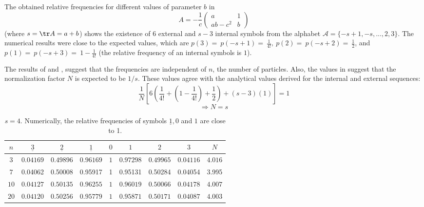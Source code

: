 The obtained relative frequencies for different values of parameter $b$ in
\[
A
= - \frac{1}{c}\left( \begin{array}{ll}
       a &1\\
       ab-c^2 & b
       \end{array} \right)
\]
(where $ s= \tr A =a+b $) shows the existence of 6 external and $s-3$
internal symbols from the alphabet $\mathcal{A} =  \{-s+1, -s, ..., 2,
3\} $. The numerical results were close to the expected values, which are $
p(3)= \ p(-s+1) = \ \frac{1}{4!}, \ p(2) = \ p(-s+2)= \ \frac{1}{2} $,
and \ $p(1)= \ p(-s+3) = \ 1-\frac{1}{4!}$ (the relative frequency of an
internal symbols is $1$).

The results of  and ,
suggest that the frequencies are independent of $n$, the number of
particles. Also, the values in  suggest that
the normalization factor $N$ is expected to be ${1}/{s}$. These
values agree with the analytical values derived for the internal and
external sequences:\\
$$ \frac{1}{N} \left[ 6 \left( \frac{1}{4!}+(1-\frac{1}{4!})+\frac{1}{2}\right) + (s-3)(1) \right] = 1$$
$$\Rightarrow N = s$$

\begin{table}
\begin{center}
\begin{tabular}{c|c|c|c|c|c|c|c|c|}
$n $& $\underline{3}$& $\underline{2}$ & $\underline{1}$ & $0$ & $1$ & $2$ & $3$ & $N$ \\
   \hline
$3$ & $0.04169$ & $0.49896$ & $ 0.96169$ & $1$ & $0.97298$ & $0.49965$ & $0.04116$ & $4.016$\\
 $7$ &  0.04062 & 0.50008 &   0.95917 &  1&  0.95131 &  0.50284 &  0.04054 & 3.995 \\
 $10$ & $0.04127$ &  $0.50135$ &  $0.96255$ &  $ 1$  & $ 0.96019$ & $0.50066$ & $ 0.04178$&$4.007$\\
 $20$ &$0.04120$ & $ 0.50256$ & $ 0.95779 $ & $ 1$ & $0.95871$ & $0.50171$ &  $0.04087$ & $4.003$\\
 \hline
\end{tabular}
\end{center}
\caption{\label{freqDiffParNum1}
$s=4$. Numerically, the relative frequencies of symbols $\underline{1}, 0$ and $1$
are close to 1.
}
\end{table}


